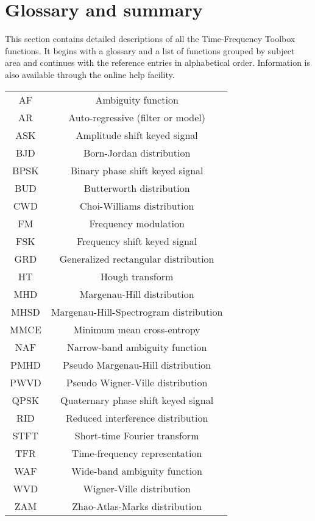 

\section*{Glossary and summary}

This section contains detailed descriptions of all the Time-Frequency Toolbox
functions. It begins with a glossary and a list of functions grouped by
subject area and continues with the reference entries in alphabetical
order. Information is also available through the online help facility.

\vspace*{1cm}

\begin{center}
\begin{tabular}{|c|c|}
\hline 
AF & Ambiguity function\\
AR & Auto-regressive (filter or model)\\
ASK & Amplitude shift keyed signal\\
BJD & Born-Jordan distribution\\
BPSK & Binary phase shift keyed signal\\
BUD & Butterworth distribution\\
CWD & Choi-Williams distribution\\
FM & Frequency modulation\\
FSK & Frequency shift keyed signal\\
GRD & Generalized rectangular distribution\\
HT & Hough transform\\
MHD & Margenau-Hill distribution \\
MHSD & Margenau-Hill-Spectrogram distribution \\ 
MMCE & Minimum mean cross-entropy\\
NAF & Narrow-band ambiguity function\\
PMHD & Pseudo Margenau-Hill distribution\\
PWVD & Pseudo Wigner-Ville distribution\\
QPSK & Quaternary phase shift keyed signal\\
RID & Reduced interference distribution\\
STFT & Short-time Fourier transform\\
TFR & Time-frequency representation\\
WAF & Wide-band ambiguity function\\
WVD & Wigner-Ville distribution\\
ZAM & Zhao-Atlas-Marks distribution\\
\hline 
\end{tabular} 
\end{center}

